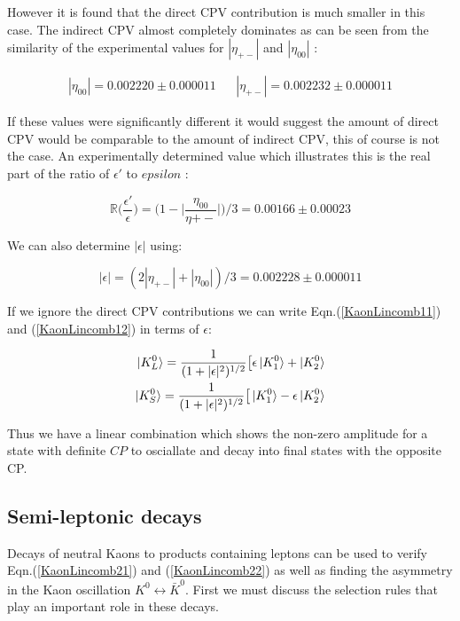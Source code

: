 \noindent However it is found that the direct CPV contribution is much smaller in this case. The indirect CPV almost completely dominates as can be seen from the similarity of the experimental values for $|\eta_{+-}|$ and $|\eta_{00}|$ \cite{PDGKaons}:

\begin{align*}
|\eta_{00}| = 0.002220 \pm 0.000011 &  & |\eta_{+-}| = 0.002232 \pm 0.000011 
\end{align*}  

\noindent If these values were significantly different it would suggest the amount of direct CPV would be comparable to the amount of indirect CPV, this of course is not the case. An experimentally determined value which illustrates this is the real part of the ratio of $\epsilon'$ to $epsilon$ \cite{PDGKaons}:

\begin{equation*}
\mathbb{R} \big(\frac{\epsilon'}{\epsilon} \big)  = \big(1 - \big|\frac{\eta_{00}}{\eta{+-}}\big|\big) / 3 = 0.00166 \pm 0.00023
\end{equation*}

\noindent We can also determine $|\epsilon|$ using:

\begin{equation*} 
|\epsilon| = (2 |\eta_{+-}| + |\eta_{00}|)/3 = 0.002228 \pm 0.000011
\end{equation*} 


\noindent If we ignore the direct CPV contributions we can write Eqn.(\ref{KaonLincomb11}) and (\ref{KaonLincomb12}) in terms of $\epsilon$:

\begin{align}
\label{KaonLincomb21}
\ket{K^{0}_{L}} = \frac{1}{(1+|\epsilon|^2)^{1/2}} \big[ \epsilon \ket{K^{0}_{1}} + \ket{K^{0}_{2}} \\
\label{KaonLincomb22}
\ket{K^{0}_{S}} = \frac{1}{(1+|\epsilon|^2)^{1/2}} \big[ \ket{K^{0}_{1}} - \epsilon \ket{K^{0}_{2}}
\end{align}

\noindent Thus we have a linear combination which shows the non-zero amplitude for a state with definite $CP$ to osciallate and decay into final states with the opposite CP.

\subsection{Semi-leptonic decays}

Decays of neutral Kaons to products containing leptons can be used to verify Eqn.(\ref{KaonLincomb21}) and (\ref{KaonLincomb22}) as well as finding the asymmetry in the Kaon oscillation $K^{0} \leftrightarrow \bar{K}^{0}$. First we must discuss the selection rules that play an important role in these decays.

